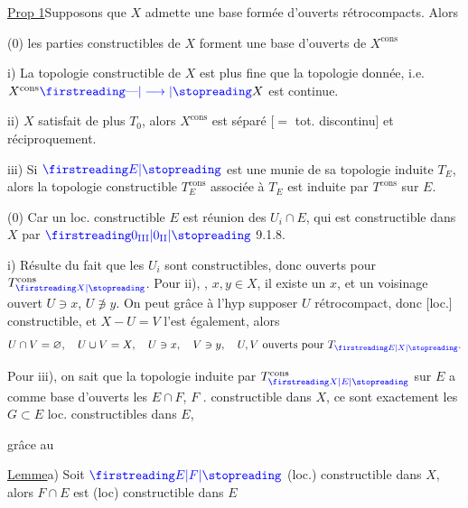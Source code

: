 \uline{Prop 1}\quad Supposons que  $X$ admette une base  formée d'ouverts rétrocompacts. Alors

(0) les parties constructibles de $X$ forment une base d'ouverts de $X^{\mathrm{cons}}$

i) La topologie constructible de $X$ est plus fine que la topologie donnée, i.e. $X^{\mathrm{cons}}\unsure{\text{---}|\longrightarrow}X$ est continue.

ii)  $X$ satisfait de plus $T_0$, alors $X^{\mathrm{cons}}$ est séparé [$=$ tot. discontinu] et réciproquement.

iii) Si $\unsure{E}$ est une  munie de sa topologie induite $T_E$, alors la topologie constructible $T_E^{\mathrm{cons}}$ associée à $T_E$ est induite par $T^{\mathrm{cons}}$ sur $E$.


(0) Car un loc. constructible $E$ est réunion des $U_i\cap E$, qui est constructible dans $X$ par $\unsure{0_{\mathrm{III}}|0_{\mathrm{II}}}$ 9.1.8.

i) Résulte du fait que les $U_i$ sont \inserted{[loc]} constructibles, donc ouverts pour $T_{\unsure{X}}^{\mathrm{cons}}$. Pour ii), , $x,y\in X$, il existe un  $x$, et un voisinage ouvert $U\ni x$, $U\not\ni y$. On peut grâce à l'hyp supposer $U$ rétrocompact, donc [loc.] constructible, et $X-U=V$ l'est  également, alors
\[
U\cap V=\varnothing,\quad U\cup V=X,\quad U\ni x,\quad V\ni y,\quad U,V\text{ ouverts pour }T_{\unsure{E|X}}.
\]

Pour iii), on sait que la topologie induite par $T_{\unsure{X|E}}^{\mathrm{cons}}$ sur $E$ a comme base d'ouverts les $E\cap F$, $F$ . constructible dans $X$, ce sont exactement les $G\subset E$ loc. constructibles dans $E$,


grâce au

\uline{Lemme}\quad a) Soit $\unsure{E|F}$ (loc.) constructible dans $X$,  alors $F\cap E$ est (loc) constructible dans $E$

